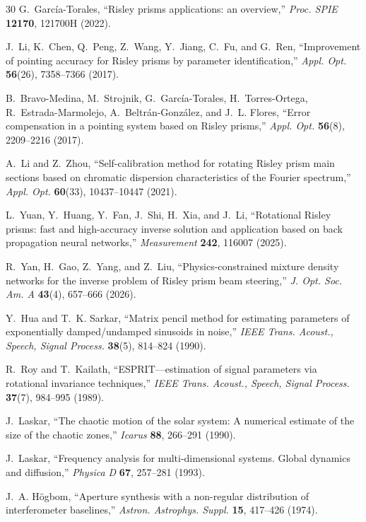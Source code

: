 \documentclass[twocolumn,preprintnumbers,amsmath,amssymb,pra,floatfix]{revtex4-2}
\begin{document}
\begin{thebibliography}{30}
G.~Garc\'ia-Torales, ``Risley prisms applications: an overview,''
\emph{Proc. SPIE} \textbf{12170}, 121700H (2022).

J.~Li, K.~Chen, Q.~Peng, Z.~Wang, Y.~Jiang, C.~Fu, and G.~Ren,
``Improvement of pointing accuracy for Risley prisms by parameter
identification,'' \emph{Appl. Opt.} \textbf{56}(26), 7358--7366
(2017).

B.~Bravo-Medina, M.~Strojnik, G.~Garc\'ia-Torales, H.~Torres-Ortega,
R.~Estrada-Marmolejo, A.~Beltr\'an-Gonz\'alez, and J.~L. Flores,
``Error compensation in a pointing system based on Risley prisms,''
\emph{Appl. Opt.} \textbf{56}(8), 2209--2216 (2017).

A.~Li and Z.~Zhou, ``Self-calibration method for rotating Risley prism
main sections based on chromatic dispersion characteristics of the
Fourier spectrum,'' \emph{Appl. Opt.} \textbf{60}(33), 10437--10447
(2021).

L.~Yuan, Y.~Huang, Y.~Fan, J.~Shi, H.~Xia, and J.~Li, ``Rotational Risley
prisms: fast and high-accuracy inverse solution and application based on
back propagation neural networks,'' \emph{Measurement} \textbf{242},
116007 (2025).

R.~Yan, H.~Gao, Z.~Yang, and Z.~Liu, ``Physics-constrained mixture
density networks for the inverse problem of Risley prism beam steering,''
\emph{J. Opt. Soc. Am. A} \textbf{43}(4), 657--666 (2026).

Y.~Hua and T.~K. Sarkar, ``Matrix pencil method for estimating
parameters of exponentially damped/undamped sinusoids in noise,''
\emph{IEEE Trans. Acoust., Speech, Signal Process.} \textbf{38}(5),
814--824 (1990).

R.~Roy and T.~Kailath, ``ESPRIT---estimation of signal parameters via
rotational invariance techniques,''
\emph{IEEE Trans. Acoust., Speech, Signal Process.} \textbf{37}(7),
984--995 (1989).

J.~Laskar, ``The chaotic motion of the solar system: A numerical estimate
of the size of the chaotic zones,''
\emph{Icarus} \textbf{88}, 266--291 (1990).

J.~Laskar, ``Frequency analysis for multi-dimensional systems. Global
dynamics and diffusion,''
\emph{Physica D} \textbf{67}, 257--281 (1993).

J.~A. H\"ogbom, ``Aperture synthesis with a non-regular distribution
of interferometer baselines,''
\emph{Astron. Astrophys. Suppl.} \textbf{15}, 417--426 (1974).


\end{thebibliography}
\end{document}
